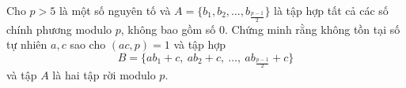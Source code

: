 \ifshowproblem
\begin{problem}\label{example:IRN-2015-MO3-NP3}
	Cho $p > 5$ là một số nguyên tố và $A = \{b_1, b_2, \dots, b_{\frac{p-1}{2}}\}$ là tập hợp tất cả các số chính phương modulo $p$,
	không bao gồm số $0$. Chứng minh rằng không tồn tại số tự nhiên $a, c$ sao cho $(ac, p) = 1$ và tập hợp  
	\[
		B = \{ ab_1 + c,\ ab_2 + c,\ \dots,\ ab_{\frac{p-1}{2}} + c \}
	\]  
	và tập $A$ là hai tập rời modulo $p$.
\end{problem}
\fi

\footnotemark
{}
\fi